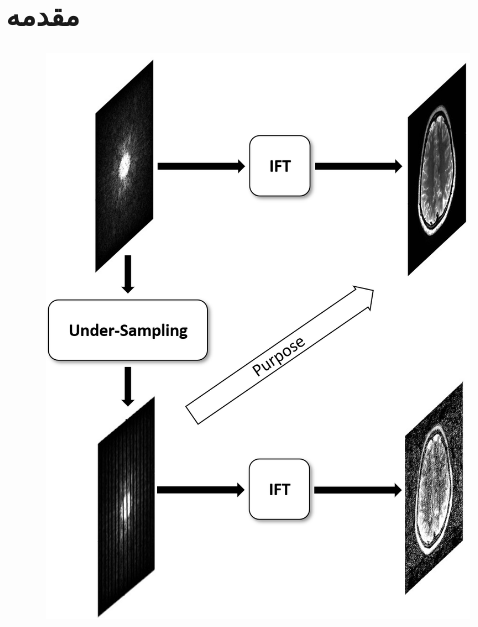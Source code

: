 \section{مقدمه}







\begin{figure}[t!]
	\centering
	\includegraphics[width=0.3\linewidth]{chapters/chapter-3/figs/purpose-diagram}
	\caption{}
	\label{fig:purpose-diagram}
\end{figure}















